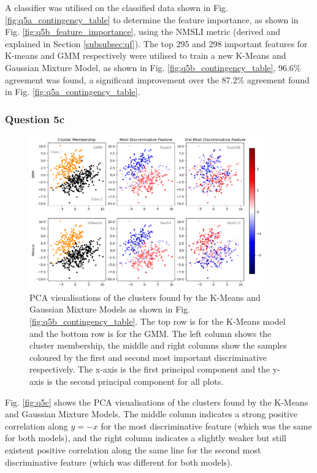     A  classifier was utilised on the classified data shown in Fig. \eqref{fig:q5a_contingency_table}
    to determine the feature importance, as shown in Fig. \eqref{fig:q5b_feature_importance}, using the NMSLI metric
    (derived and explained in Section \eqref{subsubsec:qf}).
    The top 295 and 298 important features for K-means and GMM respectively were utilised to train a new K-Means and Gaussian
    Mixture Model, as shown in Fig. \eqref{fig:q5b_contingency_table}, 96.6\% agreement was found, a significant improvement
    over the 87.2\% agreement found in Fig. \eqref{fig:q5a_contingency_table}.

\subsubsection{Question 5c}\label{subsubsec:q5c}
    \begin{figure}[htb]
    \centering
    \includegraphics[width=0.9\textwidth]{./figures/q5c}
    \caption{PCA visualisations of the clusters found by the K-Means and Gaussian Mixture Models as shown in Fig.
        \eqref{fig:q5b_contingency_table}. The top row is for the K-Means model and the bottom row is for the GMM.
        The left column shows the cluster membership, the middle and right columns show the samples coloured by the
        first and second most important discriminative respectively. The x-axis is the first principal component and the
        y-axis is the second principal component for all plots.}
    \label{fig:q5c}
    \end{figure}

    Fig. \eqref{fig:q5c} shows the PCA visualisations of the clusters found by the K-Means and Gaussian Mixture Models.
    The middle column indicates a strong positive correlation along $y=-x$ for the most discriminative feature (which was
    the same for both models), and the right column indicates a slightly weaker but still existent positive correlation
    along the same line for the second most discriminative feature (which was different for both models).

